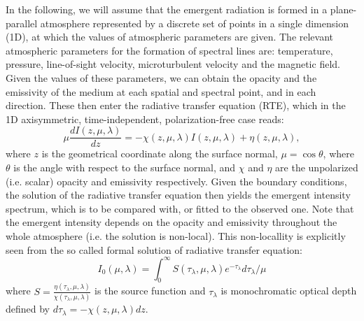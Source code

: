 \documentclass[referee]{aa}
\begin{document}
In the following, we will assume that the emergent radiation is formed in a plane-parallel atmosphere represented by a discrete set of points in a single dimension (1D), at which the values of atmospheric parameters are given. The relevant atmospheric parameters for the formation of spectral lines are: temperature, pressure, line-of-sight 	velocity, microturbulent velocity and the magnetic field. Given the values of these parameters, we can obtain the opacity and the emissivity of the medium at each spatial and spectral point, and in each direction. These then enter the radiative transfer equation (RTE), which in the 1D axisymmetric, time-independent, polarization-free case reads:
\begin{equation}
 \mu \frac{dI(z,\mu,\lambda)}{dz} = -\chi(z,\mu,\lambda) I(z,\mu,\lambda) + \eta(z,\mu,\lambda),
 \label{rte}
\end{equation}
where $z$ is the geometrical coordinate along the surface normal, $\mu = \cos \theta$, where $\theta$ is the angle with respect to the surface normal, and $\chi$ and $\eta$ are the unpolarized (i.e. scalar) opacity and emissivity respectively. Given the boundary conditions, the solution of the radiative transfer equation then yields the emergent intensity spectrum, which is to be compared with, or fitted to the observed one. Note that the emergent intensity depends on the opacity and emissivity throughout the whole atmosphere (i.e. the solution is non-local). This non-locallity is explicitly seen from the so called formal solution of radiative transfer equation:
\begin{equation}
 I_0(\mu,\lambda) = \int_0^{\infty} S(\tau_{\lambda},\mu,\lambda) e^{-\tau_{\lambda}} d\tau_{\lambda} / \mu
\end{equation}
where $S=\frac{\eta(\tau_{\lambda},\mu,\lambda)}{\chi(\tau_{\lambda},\mu,\lambda)}$ is the source function and $\tau_{\lambda}$ is monochromatic optical depth defined by $d\tau_{\lambda} = -\chi(z,\mu,\lambda)dz$.
\end{document}

